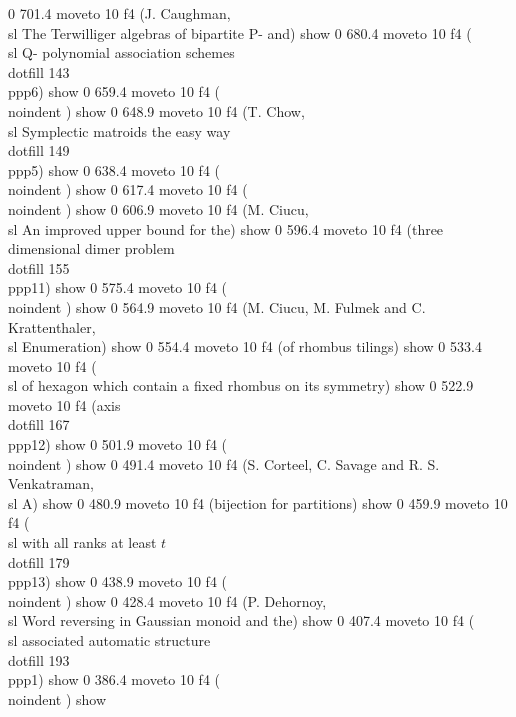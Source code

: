 0 701.4 moveto
10 f4
(J. Caughman,  {\\sl The Terwilliger algebras of bipartite P- and}) show
0 680.4 moveto
10 f4
({\\sl  Q- polynomial association schemes}\\dotfill   143\\ppp{6}) show
0 659.4 moveto
10 f4
(\\noindent   ) show
0 648.9 moveto
10 f4
(T. Chow,  {\\sl Symplectic matroids the easy way}\\dotfill  149\\ppp{5}) show
0 638.4 moveto
10 f4
(\\noindent     ) show
0 617.4 moveto
10 f4
(\\noindent    ) show
0 606.9 moveto
10 f4
(M. Ciucu,  {\\sl An improved upper bound for the) show
0 596.4 moveto
10 f4
(three dimensional dimer problem}\\dotfill   155\\ppp{11}) show
0 575.4 moveto
10 f4
(\\noindent     ) show
0 564.9 moveto
10 f4
(M. Ciucu, M. Fulmek and C. Krattenthaler,  {\\sl Enumeration) show
0 554.4 moveto
10 f4
(of rhombus tilings}) show
0 533.4 moveto
10 f4
({\\sl  of hexagon which contain a fixed rhombus on its symmetry) show
0 522.9 moveto
10 f4
(axis}\\dotfill   167\\ppp{12}) show
0 501.9 moveto
10 f4
(\\noindent     ) show
0 491.4 moveto
10 f4
(S. Corteel, C. Savage and R. S. Venkatraman,  {\\sl A) show
0 480.9 moveto
10 f4
(bijection for partitions}) show
0 459.9 moveto
10 f4
({\\sl  with all ranks at least $t$}\\dotfill   179\\ppp{13}) show
0 438.9 moveto
10 f4
(\\noindent     ) show
0 428.4 moveto
10 f4
(P. Dehornoy,  {\\sl Word reversing in Gaussian monoid and the}) show
0 407.4 moveto
10 f4
({\\sl  associated automatic structure}\\dotfill   193\\ppp{1}) show
0 386.4 moveto
10 f4
(\\noindent     ) show
